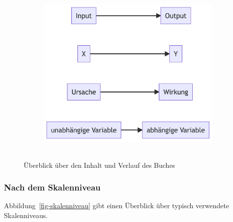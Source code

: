 \documentclass[
  a4paper,
  DIV=11]{scrreprt}
\theoremstyle{definition}
\theoremstyle{definition}
\theoremstyle{remark}
\begin{document}
\begin{figure}

{\centering 

\begin{figure}[H]

{\centering \includegraphics[width=4.11in,height=3.33in]{./fragenstellen_files/figure-latex/mermaid-figure-3.png}

}

\end{figure}

}

\caption{\label{fig-ueberblick-fragen}Überblick über den Inhalt und
Verlauf des Buches}

\end{figure}

\hypertarget{nach-dem-skalenniveau}{%
\subsubsection{Nach dem Skalenniveau}\label{nach-dem-skalenniveau}}

Abbildung~\ref{fig-skalenniveau} gibt einen Überblick über typisch
verwendete Skalenniveaus.
\end{document}
